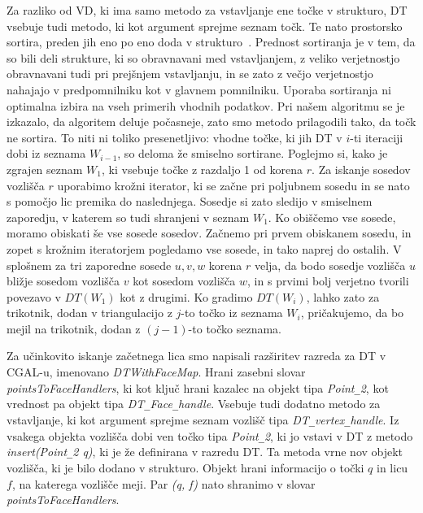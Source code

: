 \documentclass[a4paper, 12pt]{book}
\newcommand{\U}{\texttt{\_}}
\begin{document}
Za razliko od VD, ki ima samo metodo za vstavljanje ene točke v strukturo, DT vsebuje tudi metodo, ki kot argument sprejme seznam točk. Te nato prostorsko sortira, preden jih eno po eno doda v strukturo~\cite{cgal:dd-ss-15a}. Prednost sortiranja je v tem, da so bili deli strukture, ki so obravnavani med vstavljanjem, z veliko verjetnostjo obravnavani tudi pri prejšnjem vstavljanju, in se zato z večjo verjetnostjo nahajajo v predpomnilniku kot v glavnem pomnilniku. Uporaba sortiranja ni optimalna izbira na vseh primerih vhodnih podatkov. Pri našem algoritmu se je izkazalo, da algoritem deluje počasneje, zato smo metodo prilagodili tako, da točk ne sortira. To niti ni toliko presenetljivo: vhodne točke, ki jih DT v $i$-ti iteraciji dobi iz seznama $W_{i-1}$, so deloma že smiselno sortirane. Poglejmo si, kako je zgrajen seznam $W_1$, ki vsebuje točke z razdaljo 1 od korena $r$. Za iskanje sosedov vozlišča $r$  uporabimo krožni iterator, ki se začne pri poljubnem sosedu in se nato s pomočjo lic premika do naslednjega. Sosedje si zato sledijo v smiselnem zaporedju, v katerem so tudi shranjeni v seznam $W_1$. Ko obiščemo vse sosede, moramo obiskati še vse sosede sosedov. Začnemo pri prvem obiskanem sosedu, in zopet s krožnim iteratorjem pogledamo vse sosede, in tako naprej do ostalih. V splošnem za tri zaporedne sosede $u, v, w$ korena $r$ velja, da bodo sosedje vozlišča $u$ bližje sosedom vozlišča $v$ kot sosedom vozlišča $w$, in s prvimi bolj verjetno tvorili povezavo v $DT(W_1)$ kot z drugimi. Ko gradimo $DT(W_i)$, lahko zato za trikotnik, dodan v triangulacijo z $j$-to točko iz seznama $W_i$, pričakujemo, da bo mejil na trikotnik, dodan z $(j-1)$-to točko seznama.

\bigbreak

Za učinkovito iskanje začetnega lica smo napisali razširitev razreda za DT v CGAL-u, imenovano \textit{DTWithFaceMap}. Hrani zasebni slovar \textit{pointsToFaceHandlers}, ki kot ključ hrani kazalec na objekt tipa \textit{Point\U 2}, kot vrednost pa objekt tipa \textit{DT\U Face\U handle}. Vsebuje tudi dodatno metodo za vstavljanje, ki kot argument sprejme seznam vozlišč tipa \textit{DT\U vertex\U handle}. Iz vsakega objekta vozlišča dobi ven točko tipa \textit{Point\U 2}, ki jo vstavi v DT z metodo \textit{insert(Point\U 2 q)}, ki je že definirana  v razredu DT. Ta metoda vrne nov objekt vozlišča, ki je bilo dodano v strukturo. Objekt hrani informacijo o točki $q$ in licu $f$, na katerega vozlišče meji. Par \textit{(q, f)} nato shranimo v slovar \textit{pointsToFaceHandlers}.
\end{document}
